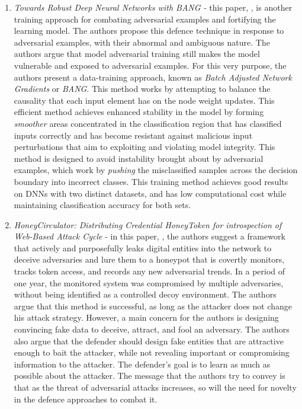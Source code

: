 \documentclass[grad,lot,lof,11pt,oneside,onehalfspace]{RUthesis}
\begin{document}
\begin{enumerate}
	\item \textit{Towards Robust Deep Neural Networks with BANG - } this paper, \cite{rozsa_towards_2016}, is another training approach for combating adversarial examples and fortifying the learning model. The authors propose this defence technique in response to  adversarial examples,  with  their abnormal and ambiguous nature.  The authors argue that model adversarial training still makes the model vulnerable and exposed to adversarial examples. For this very purpose, the authors present a data-training approach, known as \textit{Batch Adjusted Network Gradients} or \textit{BANG}. This method works by attempting to balance the causality that each input element has on the node weight updates. This efficient method achieves enhanced stability in the model by forming \textit{smoother} areas concentrated in the classification region that has classified inputs correctly and has become resistant against malicious input perturbations that aim to exploiting and violating model integrity. This method is designed to avoid instability brought about by  adversarial examples, which work by \textit{pushing} the misclassified samples across the decision boundary into incorrect classes. This training method achieves good results on DNNs  with two distinct datasets, and has low computational cost while maintaining classification accuracy for both sets. 
	\item \textit{HoneyCirculator: Distributing Credential HoneyToken for introspection of Web-Based Attack Cycle} -  in this paper, \cite{akiyama_honeycirculator:_2018 }, the authors suggest a framework that actively and purposefully leaks digital entities into the network to deceive  adversaries and lure them to a honeypot that is covertly monitors, tracks token access, and records any new adversarial trends. In a period of one year, the monitored system was compromised by multiple adversaries, without being identified as a controlled decoy environment. 
The authors argue that this method is successful, as long as the attacker does not change his attack strategy.  However, a main concern for the authors is designing convincing fake data to deceive, attract, and fool an adversary.
The authors also argue that the defender should design fake entities that are attractive enough to bait the attacker, while not revealing important or compromising information to the attacker. The defender's goal is to learn as much as possible about the attacker. The message that the authors try to convey is that as  the threat of adversarial attacks increases, so will the need for novelty in the defence approaches to combat it.
	

\end{enumerate}
\end{document}
